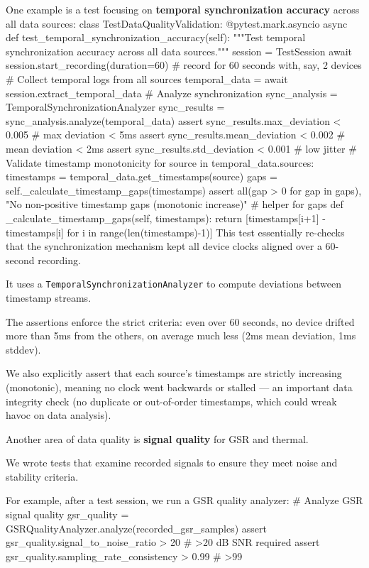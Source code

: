 {{{One example is a test focusing on \textbf{temporal synchronization accuracy}
 across all data sources: class TestDataQualityValidation: @pytest.mark.asyncio async def test\_temporal\_synchronization\_accuracy(self): """Test temporal synchronization accuracy across all data sources.""" session = TestSession await session.start\_recording(duration=60) # record for 60 seconds with, say, 2 devices # Collect temporal logs from all sources temporal\_data = await session.extract\_temporal\_data # Analyze synchronization sync\_analysis = TemporalSynchronizationAnalyzer sync\_results = sync\_analysis.analyze(temporal\_data) assert sync\_results.max\_deviation < 0.005 # max deviation < 5ms assert sync\_results.mean\_deviation < 0.002 # mean deviation < 2ms assert sync\_results.std\_deviation < 0.001 # low jitter # Validate timestamp monotonicity for source in temporal\_data.sources: timestamps = temporal\_data.get\_timestamps(source) gaps = self.\_calculate\_timestamp\_gaps(timestamps) assert all(gap > 0 for gap in gaps), "No non-positive timestamp gaps (monotonic increase)" # helper for gaps def \_calculate\_timestamp\_gaps(self, timestamps): return [timestamps[i+1] - timestamps[i] for i in range(len(timestamps)-1)] This test essentially re-checks that the synchronization mechanism kept all device clocks aligned over a 60-second recording.

It uses a \texttt{TemporalSynchronizationAnalyzer} to compute deviations between timestamp streams.

The assertions enforce the strict criteria: even over 60 seconds, no device drifted more than 5ms from the others, on average much less (2ms mean deviation, 1ms stddev).

We also explicitly assert that each source's timestamps are strictly increasing (monotonic), meaning no clock went backwards or stalled --- an important data integrity check (no duplicate or out-of-order timestamps, which could wreak havoc on data analysis).

Another area of data quality is \textbf{signal quality}
 for GSR and thermal.

We wrote tests that examine recorded signals to ensure they meet noise and stability criteria.

For example, after a test session, we run a GSR quality analyzer: # Analyze GSR signal quality gsr\_quality = GSRQualityAnalyzer.analyze(recorded\_gsr\_samples) assert gsr\_quality.signal\_to\_noise\_ratio > 20 # >20 dB SNR required assert gsr\_quality.sampling\_rate\_consistency > 0.99 # >99%

}}}

